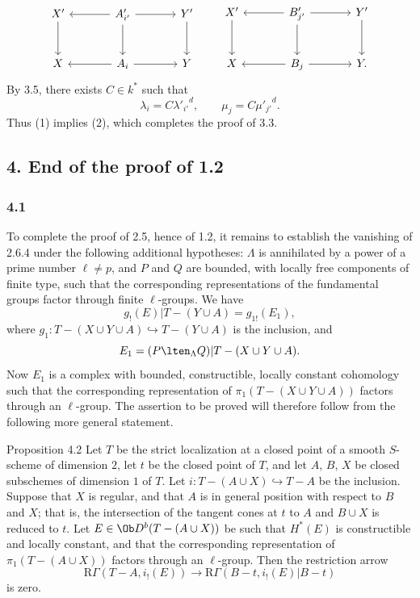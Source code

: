 \[
\begin{tikzcd}[column sep=large,row sep=large]
X' \arrow[d] & A'_{i'} \arrow[l] \arrow[r] \arrow[d] & Y' \arrow[d]\\
X & A_i \arrow[l] \arrow[r] & Y
\end{tikzcd}
\qquad
\begin{tikzcd}[column sep=large,row sep=large]
X' \arrow[d] & B'_{j'} \arrow[l] \arrow[r] \arrow[d] & Y' \arrow[d]\\
X & B_j \arrow[l] \arrow[r] & Y .
\end{tikzcd}
\]
By 3.5, there exists $C\in k^*$ such that
\[
\lambda_i=C{\lambda'_{i'}}^d,\qquad
\mu_j=C{\mu'_{j'}}^d.
\]
Thus (1) implies (2), which completes the proof of 3.3.

\subsection*{4. End of the proof of 1.2}

\subsubsection*{4.1}
To complete the proof of 2.5, hence of 1.2, it remains to establish the vanishing of 2.6.4 under the following additional hypotheses: $\Lambda$ is annihilated by a power of a prime number $\ell\ne p$, and $P$ and $Q$ are bounded, with locally free components of finite type, such that the corresponding representations of the fundamental groups factor through finite $\ell$-groups. We have
\[
g_!(E)|T-(Y\cup A)=g_{1!}(E_1),
\]
where $g_1:T-(X\cup Y\cup A)\hookrightarrow T-(Y\cup A)$ is the inclusion, and
\[
E_1=(P\lten_{\Lambda}Q)|T-(X\cup Y\cup A).
\]
Now $E_1$ is a complex with bounded, constructible, locally constant cohomology such that the corresponding representation of $\pi_1(T-(X\cup Y\cup A))$ factors through an $\ell$-group. The assertion to be proved will therefore follow from the following more general statement.

\begin{statement}{Proposition 4.2}
Let $T$ be the strict localization at a closed point of a smooth $S$-scheme of dimension $2$, let $t$ be the closed point of $T$, and let $A$, $B$, $X$ be closed subschemes of dimension $1$ of $T$. Let $i:T-(A\cup X)\hookrightarrow T-A$ be the inclusion. Suppose that $X$ is regular, and that $A$ is in general position with respect to $B$ and $X$; that is, the intersection of the tangent cones at $t$ to $A$ and $B\cup X$ is reduced to $t$. Let $E\in\Ob D^b(T-(A\cup X))$ be such that $H^*(E)$ is constructible and locally constant, and that the corresponding representation of $\pi_1(T-(A\cup X))$ factors through an $\ell$-group. Then the restriction arrow
\[
\mathrm R\Gamma(T-A,i_!(E))
\longrightarrow
\mathrm R\Gamma(B-t,i_!(E)|B-t)
\]
is zero.
\end{statement}

